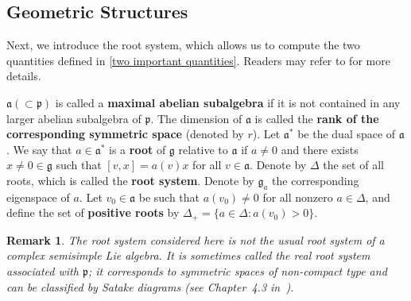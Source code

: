 \documentclass[12pt]{amsart}
\newtheorem{remark}{Remark}[section]
\begin{document}
\subsection{Geometric Structures}
Next, we introduce the root system, which allows us to compute the two quantities defined in \eqref{two important quantities}. Readers may refer to \cite{He1978} for more details.

\(\mathfrak{a} (\subset \mathfrak{p})\) is called a \textbf{maximal abelian subalgebra} if it is not contained in any larger abelian subalgebra of \(\mathfrak{p}\). The dimension of $\mathfrak{a}$ is called the \textbf{rank of the corresponding symmetric space} (denoted by $r$). Let $\mathfrak{a}^*$ be the dual space of $\mathfrak{a}$. We say that $a\in\mathfrak{a}^*$ is a \textbf{root} of $\mathfrak{g}$ relative to $\mathfrak{a}$ if \(a \neq 0\) and there exists \(x \neq 0 \in \mathfrak{g}\) such that \([v, x]=a(v) x\) for all $v\in\mathfrak{a}$. Denote by $\Delta$ the set of all roots, which is called the \textbf{root system}. Denote by $\mathfrak{g}_{a}$ the corresponding eigenspace of $a$. Let $v_{0} \in \mathfrak{a}$ be such that $a(v_{0})\neq0$ for all nonzero $a\in\Delta$, and define the set of \textbf{positive roots} by $\Delta_{+}=\{a\in\Delta: a(v_{0})>0\}$.

\begin{remark}
    The root system considered here is not the usual root system of a complex semisimple Lie algebra. It is sometimes called the \emph{real} root system associated with $\mathfrak{p}$; it corresponds to symmetric spaces of non-compact type and can be classified by Satake diagrams (see Chapter~4.3 in~\cite{OV1994}).
\end{remark}
\end{document}
